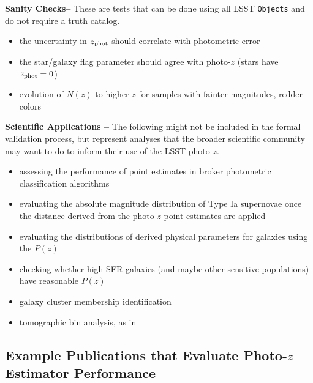 \documentclass[DM,lsstdraft,toc]{lsstdoc}
\begin{document}
{\bf Sanity Checks--} 
These are tests that can be done using all LSST {\tt Objects} and do not require a truth catalog.
\vspace{-15pt}
\begin{itemize}
\item the uncertainty in $z_{\rm phot}$ should correlate with photometric error
\item the star/galaxy flag parameter should agree with photo-$z$ (stars have $z_{\rm phot}=0$)
\item evolution of $N(z)$ to higher-$z$ for samples with fainter magnitudes, redder colors
\end{itemize}

{\bf Scientific Applications --} 
The following might not be included in the formal validation process, but represent analyses that the broader scientific community may want to do to inform their use of the LSST photo-$z$.
\vspace{-15pt}
\begin{itemize}
\item assessing the performance of point estimates in broker photometric classification algorithms
\item evaluating the absolute magnitude distribution of Type Ia supernovae once the distance derived from the photo-$z$ point estimates are applied
\item evaluating the distributions of derived physical parameters for galaxies using the $P(z)$
\item checking whether high SFR galaxies (and maybe other sensitive populations) have reasonable $P(z)$
\item galaxy cluster membership identification
\item tomographic bin analysis, as in \citep{2019MNRAS.482.2807C}
\end{itemize}


\subsection{Example Publications that Evaluate Photo-$z$ Estimator Performance}\label{ssec:imp_evalpubs}
\end{document}
